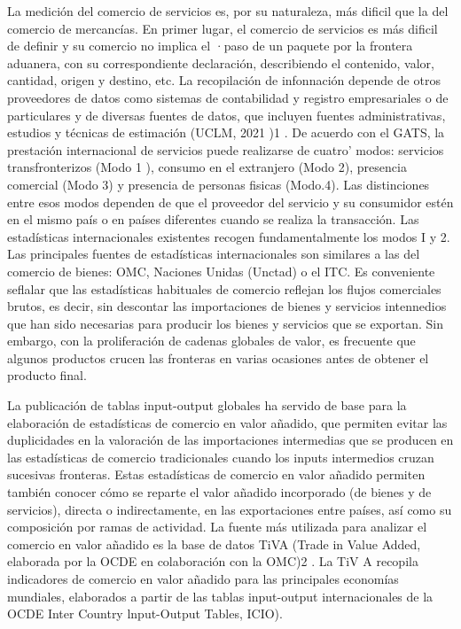\documentclass[10pt,a4paper]{article}
\begin{document}
La medición del comercio de servicios es, por su naturaleza, más dificil que la del comercio de mercancías. En primer lugar, el comercio de servicios es más dificil de definir y su comercio no implica el ·paso de un paquete por la frontera aduanera, con su correspondiente declaración, describiendo el contenido, valor, cantidad, origen y destino, etc. La recopilación de infonnación depende de otros proveedores de datos como sistemas de contabilidad y registro empresariales o de particulares y de diversas fuentes de datos, que incluyen fuentes administrativas, estudios y técnicas de estimación (UCLM, 2021 )1 . De acuerdo con el GATS, la prestación internacional de servicios puede realizarse de cuatro' modos: servicios transfronterizos (Modo 1 ), consumo en el extranjero (Modo 2), presencia comercial (Modo 3) y presencia de personas fisicas (Modo.4). Las distinciones entre esos modos dependen de que el proveedor del servicio y su consumidor estén en el mismo país o en países diferentes cuando se realiza la transacción. Las estadísticas internacionales existentes recogen fundamentalmente los modos I y 2. Las principales fuentes de estadísticas internacionales son similares a las del comercio de bienes: OMC, Naciones Unidas (Unctad) o el ITC. Es conveniente seflalar que las estadísticas habituales de comercio reflejan los flujos comerciales brutos, es decir, sin descontar las importaciones de bienes y servicios intennedios que han sido necesarias para producir los bienes y servicios que se exportan. Sin embargo, con la proliferación de cadenas globales de valor, es frecuente que algunos productos crucen las fronteras en varias ocasiones antes de obtener el producto final.

La publicación de tablas input-output globales ha servido de base para la elaboración de estadísticas de comercio en valor añadido, que permiten evitar las duplicidades en la valoración de las importaciones intermedias que se producen en las estadísticas de comercio tradicionales cuando los inputs intermedios cruzan sucesivas fronteras. Estas estadísticas de comercio en valor añadido permiten también conocer cómo se reparte el valor añadido incorporado (de bienes y de servicios), directa o indirectamente, en las exportaciones entre países, así como su composición por ramas de actividad. La fuente más utilizada para analizar el comercio en valor añadido es la base de datos TiVA (Trade in Value Added, elaborada por la OCDE en colaboración con la OMC)2 . La TiV A recopila indicadores de comercio en valor añadido para las principales economías mundiales, elaborados a partir de las tablas input-output internacionales de la OCDE Inter Country lnput-Output Tables, ICIO).
\end{document}

